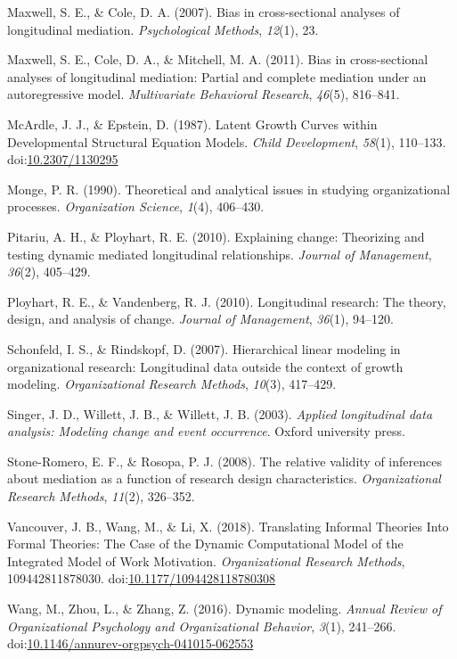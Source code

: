 \documentclass[english,,man]{apa6}
\theoremstyle{definition}
\theoremstyle{definition}
\theoremstyle{definition}
\theoremstyle{remark}
\begin{document}
\leavevmode\hypertarget{ref-maxwell2007bias}{}%
Maxwell, S. E., \& Cole, D. A. (2007). Bias in cross-sectional analyses
of longitudinal mediation. \emph{Psychological Methods}, \emph{12}(1),
23.

\leavevmode\hypertarget{ref-maxwell2011bias}{}%
Maxwell, S. E., Cole, D. A., \& Mitchell, M. A. (2011). Bias in
cross-sectional analyses of longitudinal mediation: Partial and complete
mediation under an autoregressive model. \emph{Multivariate Behavioral
Research}, \emph{46}(5), 816--841.

\leavevmode\hypertarget{ref-mcardle_latent_1987}{}%
McArdle, J. J., \& Epstein, D. (1987). Latent Growth Curves within
Developmental Structural Equation Models. \emph{Child Development},
\emph{58}(1), 110--133.
doi:\href{https://doi.org/10.2307/1130295}{10.2307/1130295}

\leavevmode\hypertarget{ref-monge_theoretical_1990}{}%
Monge, P. R. (1990). Theoretical and analytical issues in studying
organizational processes. \emph{Organization Science}, \emph{1}(4),
406--430.

\leavevmode\hypertarget{ref-pitariu_explaining_2010}{}%
Pitariu, A. H., \& Ployhart, R. E. (2010). Explaining change: Theorizing
and testing dynamic mediated longitudinal relationships. \emph{Journal
of Management}, \emph{36}(2), 405--429.

\leavevmode\hypertarget{ref-ployhart_longitudinal_2010}{}%
Ployhart, R. E., \& Vandenberg, R. J. (2010). Longitudinal research: The
theory, design, and analysis of change. \emph{Journal of Management},
\emph{36}(1), 94--120.

\leavevmode\hypertarget{ref-schonfeld2007hierarchical}{}%
Schonfeld, I. S., \& Rindskopf, D. (2007). Hierarchical linear modeling
in organizational research: Longitudinal data outside the context of
growth modeling. \emph{Organizational Research Methods}, \emph{10}(3),
417--429.

\leavevmode\hypertarget{ref-singer_applied_2003}{}%
Singer, J. D., Willett, J. B., \& Willett, J. B. (2003). \emph{Applied
longitudinal data analysis: Modeling change and event occurrence}.
Oxford university press.

\leavevmode\hypertarget{ref-stone2008relative}{}%
Stone-Romero, E. F., \& Rosopa, P. J. (2008). The relative validity of
inferences about mediation as a function of research design
characteristics. \emph{Organizational Research Methods}, \emph{11}(2),
326--352.

\leavevmode\hypertarget{ref-vancouver_translating_2018}{}%
Vancouver, J. B., Wang, M., \& Li, X. (2018). Translating Informal
Theories Into Formal Theories: The Case of the Dynamic Computational
Model of the Integrated Model of Work Motivation. \emph{Organizational
Research Methods}, 109442811878030.
doi:\href{https://doi.org/10.1177/1094428118780308}{10.1177/1094428118780308}

\leavevmode\hypertarget{ref-Wang2016}{}%
Wang, M., Zhou, L., \& Zhang, Z. (2016). Dynamic modeling. \emph{Annual
Review of Organizational Psychology and Organizational Behavior},
\emph{3}(1), 241--266.
doi:\href{https://doi.org/10.1146/annurev-orgpsych-041015-062553}{10.1146/annurev-orgpsych-041015-062553}
\end{document}
